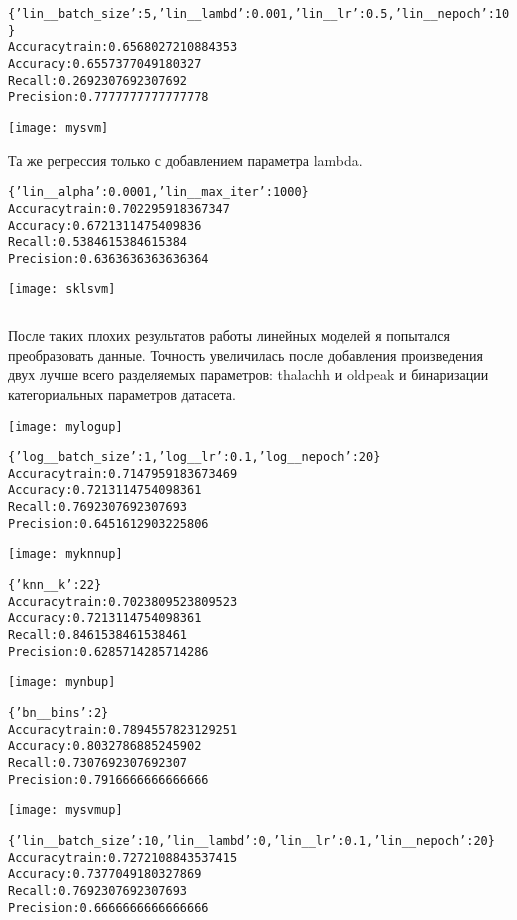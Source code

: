 \begin{alltt}
\{'lin\_\_batch\_size': 5, 'lin\_\_lambd': 0.001, 'lin\_\_lr': 0.5, 'lin\_\_nepoch': 10\}
Accuracy train: 0.6568027210884353
Accuracy: 0.6557377049180327
Recall: 0.2692307692307692
Precision: 0.7777777777777778
\end{alltt}

\texttt{[image: mysvm]} 

Та же регрессия только с добавлением параметра lambda. 

\begin{alltt}
\{'lin\_\_alpha': 0.0001, 'lin\_\_max_iter': 1000\}
Accuracy train: 0.702295918367347
Accuracy: 0.6721311475409836
Recall: 0.5384615384615384
Precision: 0.6363636363636364
\end{alltt}
\texttt{[image: sklsvm]}


\begin{lstlisting}[language=C]

\end{lstlisting}


После таких плохих результатов работы линейных моделей я попытался преобразовать данные. Точность увеличилась после добавления произведения двух лучше всего разделяемых параметров: thalachh и oldpeak и бинаризации категориальных параметров датасета. 



\texttt{[image: mylogup]}
\begin{alltt}
\{'log\_\_batch\_size': 1, 'log\_\_lr': 0.1, 'log\_\_nepoch': 20\}
Accuracy train: 0.7147959183673469
Accuracy: 0.7213114754098361
Recall: 0.7692307692307693
Precision: 0.6451612903225806
\end{alltt}


\texttt{[image: myknnup]}
\begin{alltt}
\{'knn\_\_k': 22\}
Accuracy train: 0.7023809523809523
Accuracy: 0.7213114754098361
Recall: 0.8461538461538461
Precision: 0.6285714285714286
\end{alltt}


\texttt{[image: mynbup]}
\begin{alltt}
\{'bn\_\_bins': 2\}
Accuracy train: 0.7894557823129251
Accuracy: 0.8032786885245902
Recall: 0.7307692307692307
Precision: 0.7916666666666666
\end{alltt}


\texttt{[image: mysvmup]}
\begin{alltt}
\{'lin\_\_batch\_size': 10, 'lin\_\_lambd': 0, 'lin\_\_lr': 0.1, 'lin\_\_nepoch': 20\}
Accuracy train: 0.7272108843537415
Accuracy: 0.7377049180327869
Recall: 0.7692307692307693
Precision: 0.6666666666666666
\end{alltt}



\pagebreak